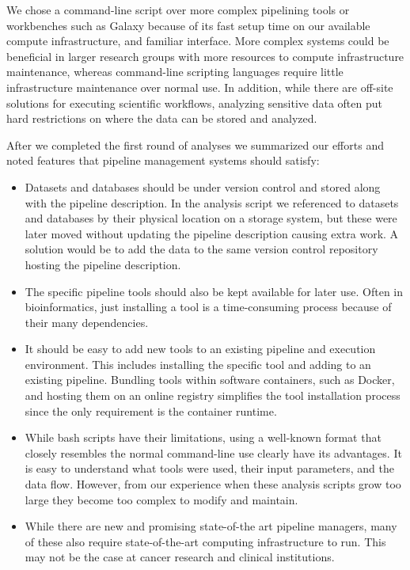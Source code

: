 We chose a command-line script over more complex pipelining tools or workbenches
such as Galaxy\cite{goecks2010galaxy} because of its fast setup time on our
available compute infrastructure, and familiar interface. More complex systems
could be beneficial in larger research groups with more resources to compute
infrastructure maintenance, whereas command-line scripting languages require
little infrastructure maintenance over normal use. In addition, while there are
off-site solutions for executing scientific workflows, analyzing sensitive data
often put hard restrictions on where the data can be stored and analyzed.

After we completed the first round of analyses we summarized our efforts and
noted features that pipeline management systems should satisfy: 
\begin{itemize}
    \item  Datasets and databases should be under version control and stored
        along with the pipeline description. In the analysis script we
        referenced to datasets and databases by their physical location on a
        storage system, but these were later moved without updating the pipeline
        description causing extra work. A solution would be to add the data to
        the same version control repository hosting the pipeline description.
    \item The specific pipeline tools should also be kept available for
        later use. Often in bioinformatics, just installing a tool is a
        time-consuming process because of their many dependencies. 
    \item It should be easy to add new tools to an existing
        pipeline and execution environment. This includes installing the specific
        tool and adding to an existing pipeline. Bundling tools within software
        containers, such as Docker, and hosting them on an online registry
        simplifies the tool installation process since the only requirement is
        the container runtime.
    \item While bash scripts have their limitations, using a well-known format
        that closely resembles the normal command-line use clearly have its
        advantages. It is easy to understand what tools were used, their input
        parameters, and the data flow.  However, from our experience when these
        analysis scripts grow too large they become too complex to modify and
        maintain. 
    \item While there are new and promising state-of-the art pipeline
        managers, many of these also require state-of-the-art computing
        infrastructure to run. This may not be the case at cancer research
        and clinical institutions. 
\end{itemize} 


